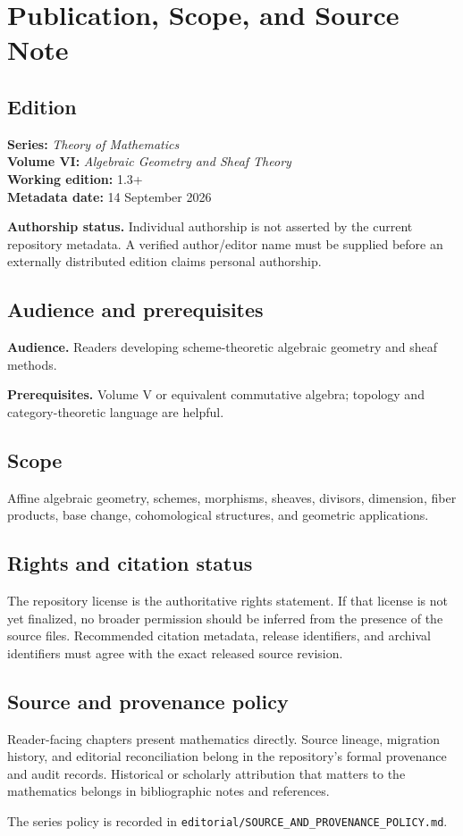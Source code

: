 \chapter*{Publication, Scope, and Source Note}
{}

\section*{Edition}
\textbf{Series:} \emph{Theory of Mathematics}\\
\textbf{Volume VI:} \emph{Algebraic Geometry and Sheaf Theory}\\
\textbf{Working edition:} 1.3+\\
\textbf{Metadata date:} 14 September 2026

\textbf{Authorship status.} Individual authorship is not asserted by the current repository metadata. A verified author/editor name must be supplied before an externally distributed edition claims personal authorship.

\section*{Audience and prerequisites}
\textbf{Audience.} Readers developing scheme-theoretic algebraic geometry and sheaf methods.

\textbf{Prerequisites.} Volume V or equivalent commutative algebra; topology and category-theoretic language are helpful.

\section*{Scope}
Affine algebraic geometry, schemes, morphisms, sheaves, divisors, dimension, fiber products, base change, cohomological structures, and geometric applications.

\section*{Rights and citation status}
The repository license is the authoritative rights statement. If that license is
not yet finalized, no broader permission should be inferred from the presence of
the source files. Recommended citation metadata, release identifiers, and
archival identifiers must agree with the exact released source revision.

\section*{Source and provenance policy}
Reader-facing chapters present mathematics directly. Source lineage, migration
history, and editorial reconciliation belong in the repository's formal
provenance and audit records. Historical or scholarly attribution that matters
to the mathematics belongs in bibliographic notes and references.

The series policy is recorded in
\texttt{editorial/SOURCE\_AND\_PROVENANCE\_POLICY.md}.
